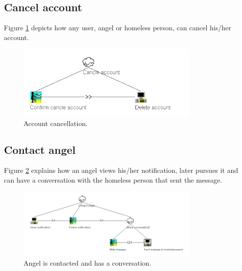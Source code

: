 \documentclass[a4paper]{report}
\begin{document}
\subsection{Cancel account}
Figure \ref{fig:CTTCancle} depicts how any user, angel or homeless person, can cancel his/her account. 
\begin{figure}[h]
    \centering
    \includegraphics[width=0.8\textwidth]{CTT/CTTpng/CTTCancle.png}
    \caption{Account cancellation.}
    \label{fig:CTTCancle}
\end{figure}

\subsection{Contact angel}
Figure \ref{fig:CTTContactAngel} explains how an angel views his/her notification, later pursues it and can have a conversation with the homeless person that sent the message.
\begin{figure}[h]
    \centering
    \includegraphics[width=0.8\textwidth]{CTT/CTTpng/CTTContactAngel.png}
    \caption{Angel is contacted and has a conversation.}
    \label{fig:CTTContactAngel}
\end{figure}
\end{document}
